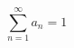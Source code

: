 \documentclass[a4paper,12pt]{article}
\begin{document}
  
$$
\sum_{n=1}^{\infty}a_n=1
$$
\end{document}

